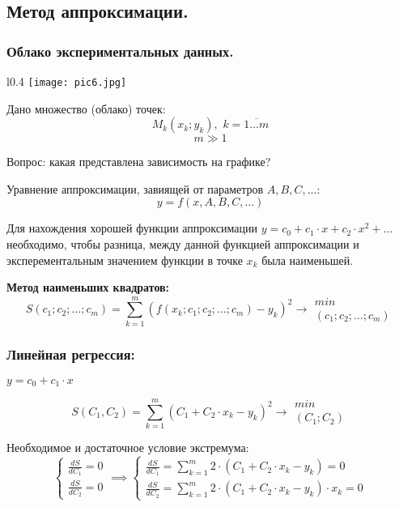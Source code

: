 \documentclass[12pt]{article}
\begin{document}
\subsection{Метод аппроксимации.}
\subsubsection{Облако экспериментальных данных.}
\begin{wrapfigure}{l}{0.4\textwidth}
	\texttt{[image: pic6.jpg]}
\end{wrapfigure}

Дано множество (облако) точек:
\[ M_k(x_k;y_k), \hspace{4pt} k=\overline{1 \ldots m} \]
\[ m \gg 1 \]

Вопрос: какая представлена зависимость на графике?

Уравнение аппроксимации, завиящей от параметров \( A, B, C, \ldots \):
\[ y = f(x, A, B, C, \ldots) \]

\vspace{10pt}
Для нахождения хорошей функции аппроксимации \( y = c_0 + c_1 \cdot x + c_2
\cdot x^2 + \ldots  \)
необходимо, чтобы разница, между данной функцией аппроксимации и
эксперементальным значением функции в точке \( x_k \) была наименьшей.

\textbf{Метод наименьших квадратов:}
\[
	S(c_1; c_2; \ldots; c_m) =
	\sum_{k=1}^{m}(f(x_k; c_1; c_2; \ldots ; c_m) - y_k)^2 \to
	\substack{min\\(c_1; c_2; \ldots ; c_m)}
\]


\subsubsection{Линейная регрессия:}
\hspace{40pt} \( y = c_0 + c_1 \cdot x \)

\[
	S(C_1, C_2) = \sum_{k=1}^m \left( C_1 + C_2 \cdot x_k - y_k \right)^2
	\to \substack{min\\(C_1; C_2)}
\]

Необходимое и достаточное условие экстремума:
\begin{equation*}
	\begin{cases}
		\frac{dS}{dC_1} = 0 \\
		\frac{dS}{dC_2} = 0
	\end{cases}
	\implies
	\begin{cases}
		\frac{dS}{dC_1} =
		\sum_{k=1}^m 2 \cdot \left( C_1 + C_2 \cdot x_k - y_k \right) = 0 \\
		\frac{dS}{dC_2} =
		\sum_{k=1}^m 2 \cdot \left( C_1 + C_2 \cdot x_k - y_k \right) \cdot x_k = 0
	\end{cases}
\end{equation*}
\end{document}
